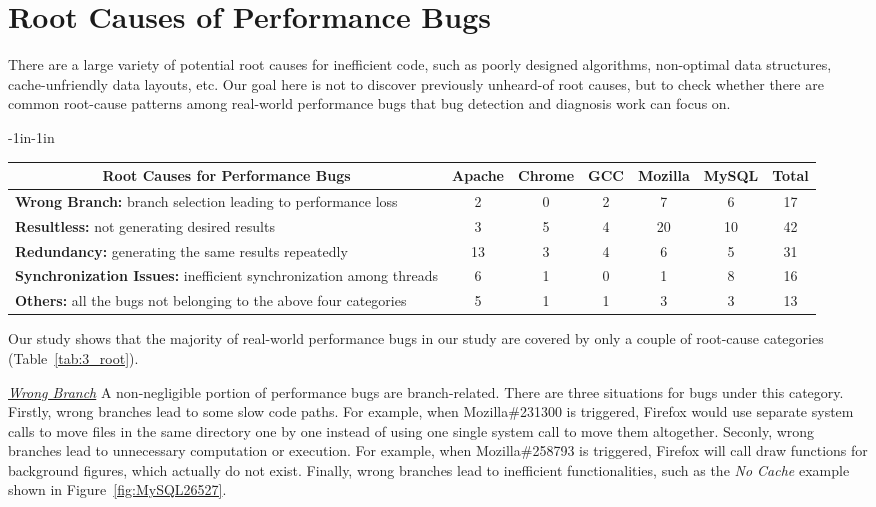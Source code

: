 




\section{Root Causes of Performance Bugs}
\label{sec:3_root}

There are a large variety of potential root causes for inefficient code, 
such as poorly designed algorithms, non-optimal data structures, cache-unfriendly data layouts, etc. 
Our goal here is not to discover previously unheard-of root causes, 
but to check whether there are common root-cause patterns among 
real-world performance bugs that bug detection and diagnosis work can focus on.

\begin{table*}[tb!]
\begin{adjustwidth}{-1in}{-1in}
\scriptsize
\centering
{

\begin{tabular}{lcccccc}
\toprule
\multicolumn{1}{c}{\bf Root Causes for Performance Bugs} &Apache&Chrome&GCC&Mozilla&MySQL&Total\\
\midrule
\multicolumn{1}{l}{{\bf Wrong Branch:} branch selection leading to performance loss}
&2&0&2&7&6&17\\
\midrule
\multicolumn{1}{l}{{\bf Resultless:} not generating desired results}
&3&5&4&20&10&42\\
\midrule
\multicolumn{1}{l}{{\bf Redundancy:} generating the same results repeatedly}
&13&3&4&6&5&31\\
\midrule
\multicolumn{1}{l}{{\bf Synchronization Issues:} inefficient synchronization among threads}
&6&1&0&1&8&16\\
\midrule
\multicolumn{1}{l}{{\bf Others:} all the bugs not belonging to the above four categories}
&5&1&1&3&3&13\\
\bottomrule

\end{tabular}
}
\end{adjustwidth}
\caption{Root cause categorization in Section~\ref{sec:3_root}.}
\label{tab:3_root}
\end{table*}

Our study shows that the majority of real-world performance bugs in our study 
are covered by only a couple of root-cause categories (Table~\ref{tab:3_root}).

\underline{\it Wrong Branch} 
A non-negligible portion of performance bugs are branch-related.
There are three situations for bugs under this category. 
Firstly, wrong branches lead to some slow code paths. 
For example, when Mozilla\#231300 is triggered, 
Firefox would use separate system calls to move files 
in the same directory one by one instead of using one single system call to move them altogether. 
Seconly, wrong branches lead to unnecessary computation or execution. 
For example, when Mozilla\#258793 is triggered, 
Firefox will call draw functions for background figures, which actually do not exist. 
Finally, wrong branches lead to inefficient functionalities,
such as the {\it No Cache} example shown in Figure~\ref{fig:MySQL26527}. 

